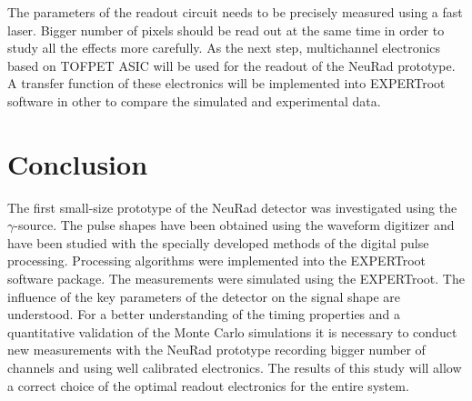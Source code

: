 \documentclass{webofc}
\newcommand{\er}{\textmd{EXPERTroot}}
\begin{document}
The parameters of the readout circuit needs to be precisely measured using a fast laser. Bigger number of pixels should be read out at the same time in order to study all the effects more carefully. As the next step, multichannel electronics based on TOFPET ASIC \cite{petsys} will be used for the readout of the NeuRad prototype. A transfer function of these electronics will be implemented into \er\, software in other to compare the simulated and experimental data.


\section{Conclusion}
		
	The first small-size prototype of the NeuRad detector was investigated using the $\gamma$-source. The pulse shapes have been obtained using the waveform digitizer and have been studied with the specially developed methods of the digital pulse processing. Processing algorithms were implemented into the EXPERTroot software package. The measurements were simulated using the \er. The influence of the key parameters of the detector on the signal shape are understood. For a better understanding of the timing properties and a quantitative validation of the Monte Carlo simulations it is necessary to conduct new measurements with the NeuRad prototype recording bigger number of channels and using well calibrated electronics.
	The results of this study will allow a correct choice of the optimal readout electronics for the entire system.
	
	
	
	
\end{document}

